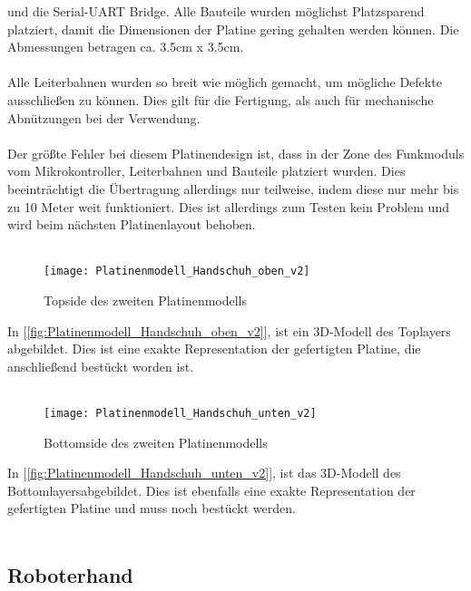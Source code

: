 \documentclass[titlepage,12pt,twoside]{article}
\begin{document}
und die Serial-UART Bridge. Alle Bauteile wurden möglichst Platzsparend platziert, damit die Dimensionen der Platine gering gehalten werden können.
Die Abmessungen betragen ca. 3.5cm x 3.5cm. \\
\\
Alle Leiterbahnen wurden so breit wie möglich gemacht, um mögliche Defekte ausschließen zu können. Dies gilt für die Fertigung, als auch für mechanische
Abnützungen bei der Verwendung. \\
\\
Der größte Fehler bei diesem Platinendesign ist, dass in der Zone des Funkmoduls vom Mikrokontroller, Leiterbahnen und Bauteile platziert wurden.
Dies beeinträchtigt die Übertragung allerdings nur teilweise, indem diese nur mehr bis zu 10 Meter weit funktioniert. Dies ist allerdings zum Testen
kein Problem und wird beim nächsten Platinenlayout behoben. \\
\\
\begin{figure}[H]
	\begin{center}
		\scalebox{0.6}
		{\texttt{[image: Platinenmodell\_Handschuh\_oben\_v2]}}
		\caption{Topside des zweiten Platinenmodells}
		\label{fig:Platinenmodell_Handschuh_oben_v2}		
	\end{center}
\end{figure}
\hfill \break
In [\textcolor{blue}{\autoref{fig:Platinenmodell_Handschuh_oben_v2}}], ist ein 3D-Modell des Toplayers abgebildet. Dies ist eine exakte Representation der gefertigten
Platine, die anschließend bestückt worden ist. \\
\\
\begin{figure}[H]
	\begin{center}
		\scalebox{0.6}
		{\texttt{[image: Platinenmodell\_Handschuh\_unten\_v2]}}
		\caption{Bottomside des zweiten Platinenmodells}
		\label{fig:Platinenmodell_Handschuh_unten_v2}		
	\end{center}
\end{figure}
\hfill \break
In [\textcolor{blue}{\autoref{fig:Platinenmodell_Handschuh_unten_v2}}], ist das 3D-Modell des Bottomlayersabgebildet. Dies ist ebenfalls eine exakte Representation der
gefertigten Platine und muss noch bestückt werden. \\
\\

\newpage
\subsection{Roboterhand}
\end{document}
